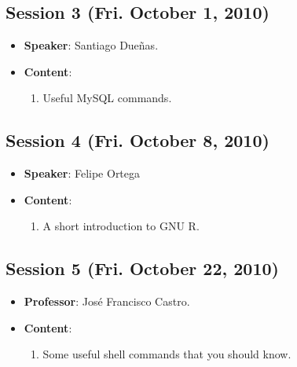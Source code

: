 \documentclass[a4paper]{article}
\begin{document}
\subsection{Session 3 (Fri. October 1, 2010)}

  \begin{itemize}
   \item \textbf{Speaker}: Santiago Dueñas.

   \item \textbf{Content}:

   \begin{enumerate}
    \item Useful MySQL commands.
   \end{enumerate}

  \end{itemize}

\subsection{Session 4 (Fri. October 8, 2010)}

\begin{itemize}
 \item \textbf{Speaker}: Felipe Ortega

  \item \textbf{Content}:

  \begin{enumerate}
   \item A short introduction to GNU R.
  \end{enumerate}

\end{itemize}

\subsection{Session 5 (Fri. October 22, 2010)}

\begin{itemize}
 \item \textbf{Professor}: José Francisco Castro.

 \item \textbf{Content}:

 \begin{enumerate}
  \item Some useful shell commands that you should know.
 \end{enumerate}

\end{itemize}
\end{document}
